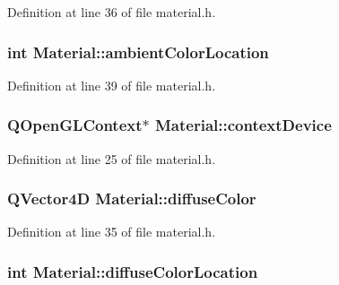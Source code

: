 Definition at line 36 of file material.\+h.

\hypertarget{class_material_a938adfa6b527c7462df99493968f14aa}{}
\subsubsection[{ambient\+Color\+Location}]{\setlength{\rightskip}{0pt plus 5cm}int Material\+::ambient\+Color\+Location\hspace{0.3cm}{\ttfamily [protected]}}\label{class_material_a938adfa6b527c7462df99493968f14aa}


Definition at line 39 of file material.\+h.

\hypertarget{class_material_a83da87bdd6d755b6f8ed40929001d355}{}
\subsubsection[{context\+Device}]{\setlength{\rightskip}{0pt plus 5cm}Q\+Open\+G\+L\+Context$\ast$ Material\+::context\+Device\hspace{0.3cm}{\ttfamily [protected]}}\label{class_material_a83da87bdd6d755b6f8ed40929001d355}


Definition at line 25 of file material.\+h.

\hypertarget{class_material_a38b1cde46c908ae719ebaf9de1efb5ff}{}
\subsubsection[{diffuse\+Color}]{\setlength{\rightskip}{0pt plus 5cm}Q\+Vector4\+D Material\+::diffuse\+Color\hspace{0.3cm}{\ttfamily [protected]}}\label{class_material_a38b1cde46c908ae719ebaf9de1efb5ff}


Definition at line 35 of file material.\+h.

\hypertarget{class_material_ad4963cc03e54c2e539a98b60070d2beb}{}
\subsubsection[{diffuse\+Color\+Location}]{\setlength{\rightskip}{0pt plus 5cm}int Material\+::diffuse\+Color\+Location\hspace{0.3cm}{\ttfamily [protected]}}\label{class_material_ad4963cc03e54c2e539a98b60070d2beb}


